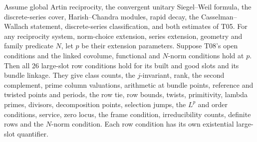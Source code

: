 \begin{formalstatement}\label{sub:T04}

Assume global Artin reciprocity, the convergent unitary Siegel--Weil formula,
the discrete-series cover, Harish--Chandra modules, rapid decay, the
Casselman--Wallach statement, discrete-series classification, and both estimates
of T05. For any reciprocity system, norm-choice extension, series extension,
geometry and family predicate $N$, let $p$ be their extension parameters.
Suppose T08's open conditions and the linked covolume, functional and
$N$-norm conditions hold at $p$. Then all 26 large-slot row conditions hold
for its built and good slots and its bundle linkage. They give class counts,
the $j$-invariant, rank, the second complement, prime column valuations,
arithmetic at bundle points, reference and twisted points and periods, the
row tie, row bounds, twists, primitivity, lambda primes, divisors,
decomposition points, selection jumps, the $L^p$ and order conditions,
service, zero locus, the frame condition, irreducibility counts, definite
rows and the $N$-norm condition. Each row condition has its own existential
large-slot quantifier.

\end{formalstatement}
